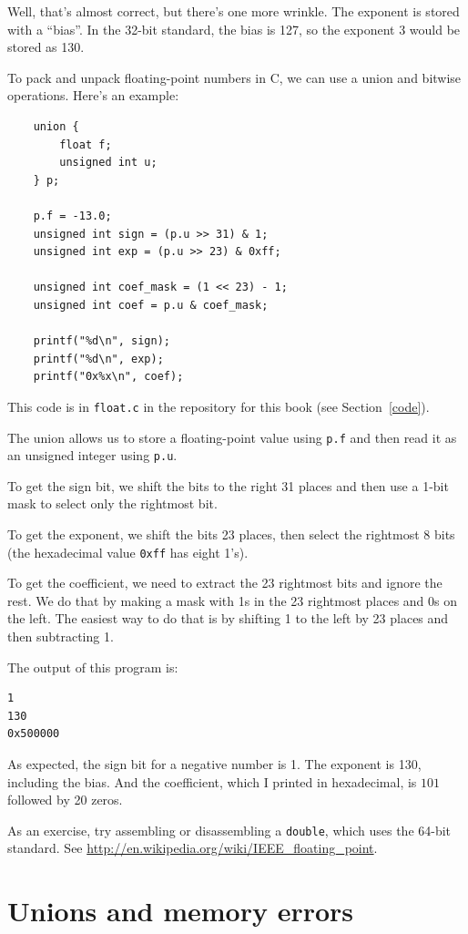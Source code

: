 \documentclass[12pt]{book}
\begin{document}
{Well, that's almost correct, but there's one more wrinkle.
The exponent is stored with a ``bias''.  In the 32-bit standard,
the bias is 127, so the exponent 3 would be stored as 130.

To pack and unpack floating-point numbers in C, we can use a 
union and bitwise operations.  Here's an example:
%
\begin{verbatim}
    union {
        float f;
        unsigned int u;
    } p;

    p.f = -13.0;
    unsigned int sign = (p.u >> 31) & 1;
    unsigned int exp = (p.u >> 23) & 0xff;

    unsigned int coef_mask = (1 << 23) - 1;
    unsigned int coef = p.u & coef_mask;

    printf("%d\n", sign);
    printf("%d\n", exp);
    printf("0x%x\n", coef);
\end{verbatim}
%
This code is in {\tt float.c} in the repository for this
book (see Section~\ref{code}).

The union allows us to store a floating-point value using
{\tt p.f} and then read it as an unsigned integer using
{\tt p.u}.

To get the sign bit, we shift the bits to the right 31
places and then use a 1-bit mask to select only the
rightmost bit.

To get the exponent, we shift the bits 23 places, then select the
rightmost 8 bits (the hexadecimal value {\tt 0xff} has eight 1's).

To get the coefficient, we need to extract the 23 rightmost bits
and ignore the rest.  We do that by making a mask with 1s in the
23 rightmost places and 0s on the left.  The easiest way to do that
is by shifting 1 to the left by 23 places and then subtracting 1.  

The output of this program is:
%
\begin{verbatim}
1
130
0x500000
\end{verbatim}
%
As expected, the sign bit for a negative number is 1.  The exponent 
is 130, including the bias.  And the coefficient, which I printed in
hexadecimal, is $101$ followed by 20 zeros.

As an exercise, try assembling or disassembling a {\tt double}, which
uses the 64-bit standard.  See
\url{http://en.wikipedia.org/wiki/IEEE_floating_point}.


\section{Unions and memory errors}

}
\end{document}

